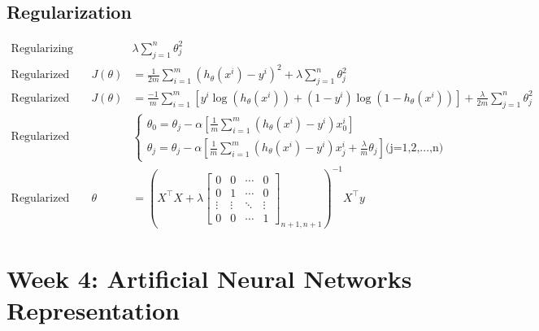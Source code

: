 \documentclass[11pt, oneside]{article}
\begin{document}
\subsection{Regularization}
	\begin{align*}
		\text{Regularizing Term} &&
			& \lambda \sum_{j=1}^n \theta_j^2\\
		\text{Regularized Linear Regression CF} &&
			J(\theta) &= \frac{1}{2 m} \sum_{i=1}^m (h_\theta(x^i) - y^i)^2 + \lambda \sum_{j=1}^n \theta_j^2\\
		\text{Regularized Logistic Regression CF} &&
			J(\theta) &= \frac{-1}{m} \sum^m_{i=1} \left[y^i\log(h_\theta(x^i)) + (1-y^i)\log(1 - h_\theta(x^i))\right] + \frac{\lambda}{2m} \sum_{j=1}^n \theta_j^2\\
		\text{Regularized GD (Lin/Log Regression)} &&
			& \begin{cases} 
				\theta_0 = \theta_j - \alpha \left[\frac{1}{m}\sum_{i=1}^m (h_\theta(x^i) - y^i)x_0^i\right]\\
				\theta_j = \theta_j - \alpha \left[\frac{1}{m}\sum_{i=1}^m (h_\theta(x^i) - y^i)x_j^i + \frac{\lambda}{m}\theta_j\right] \text{(j=1,2,...,n)}
			\end{cases}\\
		\text{Regularized Normal Equation} &&
			\theta &= (X^\intercal X + \lambda 
			\begin{bmatrix} 
				0 & 0 & \cdots & 0 \\
  				0 & 1 & \cdots & 0 \\
				\vdots  & \vdots  & \ddots & \vdots  \\
				0 & 0 & \cdots & 1 
			\end{bmatrix}_{n+1,n+1}
			)^{-1} X^\intercal y
	\end{align*}

\clearpage



\section{Week 4: Artificial Neural Networks Representation}
\end{document}
